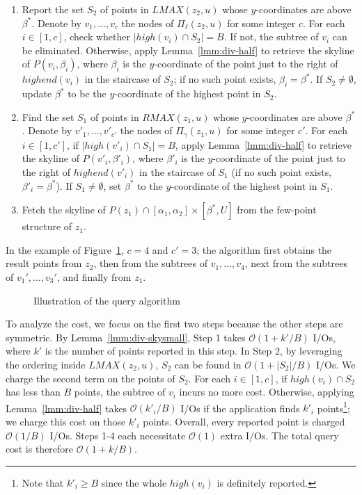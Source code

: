 \documentclass{sig-alternate}
\DeclareMathOperator*{\intr}{\cap}
\def\figcapup{\vspace{-1mm}}
\def\figcapdown{\vspace{-2mm}}
\def\high{\mathit{high}}
\def\highend{\mathit{highend}}
\def\lmax{\mathit{LMAX}}
\def\rmax{\mathit{RMAX}}
\def\intr{\cap}
\newcommand{\arxivexcl}[2]{\ifthenelse{\boolean{arxivversion}}{#1}{#2}}
\newcommand{\bigO}{\mathcal{O}}
\renewcommand{\(}{\left(}
\renewcommand{\)}{\right)}
\newcommand{\yufeigraphics}[2]{
  \arxivexcl
   {\texttt{[image: ./\#2]}}
   {\texttt{[image: ./figure/\#2]}}
}
\begin{document}
\begin{fullenv}
\begin{enumerate}
  \item Report the set $S_2$ of points in $\lmax(z_2, u)$ whose $y$-coordinates
    are above $\beta^*$. Denote by $v_1, ..., v_c$ the nodes of $\Pi_\ell(z_2,
    u)$ for some integer $c$. For each $i \in [1, c]$, check whether
    $|\high(v_i) \intr S_2| = B$. If not, the subtree of $v_i$ can be
    eliminated. Otherwise, apply Lemma~\ref{lmm:div-half} to retrieve the
    skyline of $P(v_i, \beta_i)$, where $\beta_i$ is the $y$-coordinate of the
    point just to the right of $\highend(v_i)$ in the staircase of $S_2$; if no
    such point exists, $\beta_i = \beta^*$. If $S_2 \neq \emptyset$, update
    $\beta^*$ to be the $y$-coordinate of the highest point in $S_2$.

  \item Find the set $S_1$ of points in $\rmax(z_1, u)$ whose $y$-coordinates
    are above $\beta^*$. Denote by $v'_1, ..., v'_{c'}$ the nodes of
    $\Pi_\gamma(z_1, u)$ for some integer $c'$. For each $i \in [1, c']$, if
    $|\high(v'_i) \intr S_1| = B$, apply Lemma~\ref{lmm:div-half} to retrieve
    the skyline of $P(v'_i, \beta'_i)$, where $\beta'_i$ is the $y$-coordinate
    of the point just to the right of $\highend(v'_i)$ in the staircase of
    $S_1$ (if no such point exists, $\beta'_i = \beta^*$). If $S_1 \neq
    \emptyset$, set $\beta^*$ to the $y$-coordinate of the highest point in
    $S_1$.

  \item Fetch the skyline of $P(z_1) \intr [\alpha_1, \alpha_2] \times
    [\beta^*, U]$ from the few-point structure of $z_1$.
\end{enumerate}
In the example of Figure~\ref{fig:div-qry}, $c = 4$ and $c' = 3$; the algorithm
first obtains the result points from $z_2$, then from the subtrees of $v_1,
..., v_4$, next from the subtrees of $v_1', ..., v_3'$, and finally from $z_1$.

\begin{figure}
	\centering
    \yufeigraphics{height=50mm}{const-tm-qry}
	\figcapup
	\caption{\boldmath Illustration of the query algorithm}
	\label{fig:div-qry}
	\figcapdown
\end{figure}

To analyze the cost, we focus on the first two steps because the other steps
are symmetric. By Lemma~\ref{lmm:div-skysmall}, Step 1 takes $\bigO(1 + k'/B)$
I/Os, where $k'$ is the number of points reported in this step. In Step 2, by
leveraging the ordering inside $\lmax(z_2, u)$, $S_2$ can be found in $\bigO(1
+ |S_2|/B)$ I/Os. We charge the second term on the points of $S_2$. For each $i
\in [1, c]$, if $\high(v_i) \intr S_2$ has less than $B$ points, the subtree of
$v_i$ incurs no more cost. Otherwise, applying Lemma~\ref{lmm:div-half} takes
$\bigO(k'_i/B)$ I/Os if the application finds $k'_i$ points\footnote{Note that
$k'_i \ge B$ since the whole $high(v_i)$ is definitely reported.}; we charge
this cost on those $k'_i$ points. Overall, every reported point is charged
$\bigO(1/B)$ I/Os. Steps 1-4 each necessitate $\bigO(1)$ extra I/Os. The total
query cost is therefore $\bigO(1 + k/B)$.
\end{fullenv}
\end{document}
